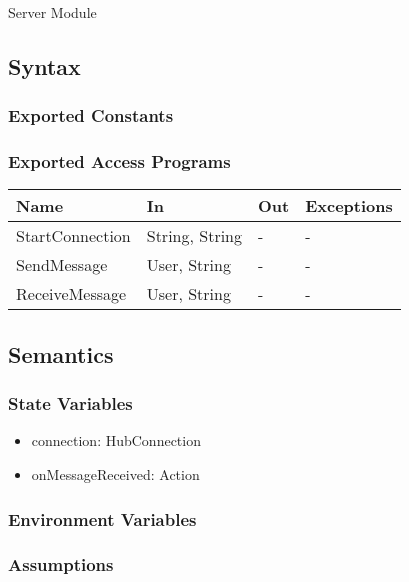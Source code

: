 \documentclass[12pt, titlepage]{article}
\begin{document}
Server Module

\subsection{Syntax}

\subsubsection{Exported Constants}

\subsubsection{Exported Access Programs}

\begin{center}
\begin{tabular}{p{4cm} p{3cm} p{3cm} p{4cm}}
\hline
\textbf{Name} & \textbf{In} & \textbf{Out} & \textbf{Exceptions} \\
\hline
StartConnection & String, String & - & - \\
SendMessage & User, String & - & - \\
ReceiveMessage & User, String & - & - \\

\hline
\end{tabular}
\end{center}

\subsection{Semantics}

\subsubsection{State Variables}

\begin{itemize}
\item connection: HubConnection
\item onMessageReceived: Action
\end{itemize}

\subsubsection{Environment Variables}

\subsubsection{Assumptions}
\end{document}
